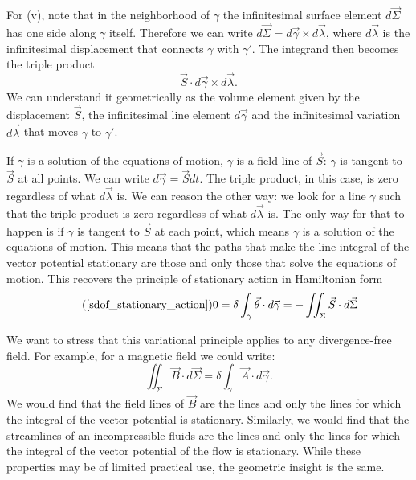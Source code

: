 \documentclass[fleqn,10pt]{wlscirep}
\begin{document}
For (v), note that in the neighborhood of $\gamma$ the infinitesimal surface element $d\vec{\Sigma}$ has one side along $\gamma$ itself. Therefore we can write $d\vec{\Sigma} = d\vec{\gamma} \times d\vec{\lambda}$, where $d\vec{\lambda}$ is the infinitesimal displacement that connects $\gamma$ with $\gamma'$. The integrand then becomes the triple product
\begin{equation}
	\vec{S} \cdot d\vec{\gamma} \times d\vec{\lambda}.
\end{equation}
We can understand it geometrically as the volume element given by the displacement $\vec{S}$, the infinitesimal line element $d\vec{\gamma}$ and the infinitesimal variation $d\vec{\lambda}$ that moves $\gamma$ to $\gamma'$.

If $\gamma$ is a solution of the equations of motion, $\gamma$ is a field line of $\vec{S}$: $\gamma$ is tangent to $\vec{S}$ at all points. We can write $d\vec{\gamma} = \vec{S} dt$. The triple product, in this case, is zero regardless of what $d\vec{\lambda}$ is. We can reason the other way: we look for a line $\gamma$ such that the triple product is zero regardless of what $d\vec{\lambda}$ is. The only way for that to happen is if $\gamma$ is tangent to $\vec{S}$ at each point, which means $\gamma$ is a solution of the equations of motion. This means that the paths that make the line integral of the vector potential stationary are those and only those that solve the equations of motion. This recovers the principle of stationary action in Hamiltonian form
\begin{equation}
\tag*{(\ref{sdof_stationary_action})}
	0 =\delta \int_{\gamma} \vec{\theta} \cdot d\vec{\gamma} = - \iint_{\Sigma} \vec{S} \cdot d\vec{\Sigma} 
\end{equation}

We want to stress that this variational principle applies to any divergence-free field. For example, for a magnetic field we could write:
\begin{equation}
	\iint_{\Sigma} \vec{B} \cdot d\vec{\Sigma} = \delta \int_{\gamma} \vec{A} \cdot d\vec{\gamma}.
\end{equation}
We would find that the field lines of $\vec{B}$ are the lines and only the lines for which the integral of the vector potential is stationary. Similarly, we would find that the streamlines of an incompressible fluids are the lines and only the lines for which the integral of the vector potential of the flow is stationary. While these properties may be of limited practical use, the geometric insight is the same.
\end{document}
